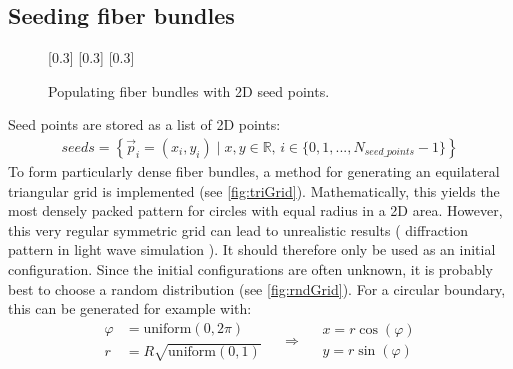 \subsection{Seeding fiber bundles}\label{sec:seeds}
%
\begin{figure}[!t]
    \setlength{\tikzheight}{0.25\textwidth}
    \centering
    [0.3\textwidth]{}
    \hfill
    [0.3\textwidth]{}
    \hfill
    [0.3\textwidth]{}
	\caption{Populating fiber bundles with 2D seed points.}
\end{figure}
%
Seed points are stored as a list of 2D points:
\begin{align}
\mathit{seeds} = \left\{ \vec{p}_i=(x_i,y_i) \mid x,y \in \mathbb{R} , \, i \in \{0,1,...,N_{\mathit{seed\_points}}-1\}\right\}
\end{align}
%
To form particularly dense fiber bundles, a method for generating an equilateral triangular grid is implemented (see \ref{fig:triGrid}).
Mathematically, this yields the most densely packed pattern for circles with equal radius in a 2D area.
However, this very regular symmetric grid can lead to unrealistic results (\eg{} diffraction pattern in light wave simulation \cite{MenzelDissertation}).
It should therefore only be used as an initial configuration.
Since the initial configurations are often unknown, it is probably best to choose a random distribution (see \cref{fig:rndGrid}).
For a circular boundary, this can be generated for example with:
% 
\begin{equation}
\begin{split}
\varphi &= \mathrm{uniform}(0,2 \pi) \\
r &= R \sqrt{\mathrm{uniform}(0,1)}
\end{split}
\quad\Rightarrow\quad
\begin{split}
x = r \cos(\varphi)\\
y = r \sin(\varphi)
\end{split}
\end{equation}
%
%
%
